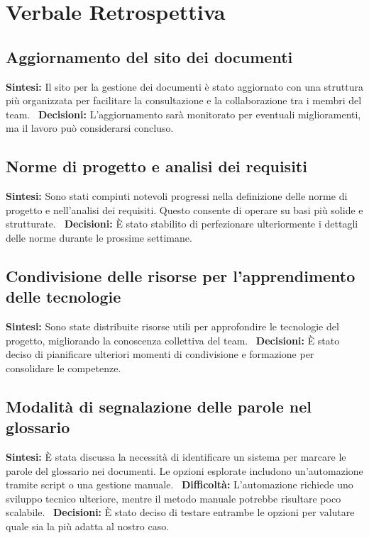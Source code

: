 \documentclass{article}
\begin{document}
\section{Verbale Retrospettiva}

\subsection{Aggiornamento del sito dei documenti} \textbf{Sintesi:} Il sito per la gestione dei documenti è stato aggiornato con una struttura più organizzata per facilitare la consultazione e la collaborazione tra i membri del team. \ \textbf{Decisioni:} L'aggiornamento sarà monitorato per eventuali miglioramenti, ma il lavoro può considerarsi concluso.

\subsection{Norme di progetto e analisi dei requisiti} \textbf{Sintesi:} Sono stati compiuti notevoli progressi nella definizione delle norme di progetto e nell’analisi dei requisiti. Questo consente di operare su basi più solide e strutturate. \ \textbf{Decisioni:} È stato stabilito di perfezionare ulteriormente i dettagli delle norme durante le prossime settimane.

\subsection{Condivisione delle risorse per l'apprendimento delle tecnologie} \textbf{Sintesi:} Sono state distribuite risorse utili per approfondire le tecnologie del progetto, migliorando la conoscenza collettiva del team. \ \textbf{Decisioni:} È stato deciso di pianificare ulteriori momenti di condivisione e formazione per consolidare le competenze.

\subsection{Modalità di segnalazione delle parole nel glossario} \textbf{Sintesi:} È stata discussa la necessità di identificare un sistema per marcare le parole del glossario nei documenti. Le opzioni esplorate includono un'automazione tramite script o una gestione manuale. \ \textbf{Difficoltà:} L'automazione richiede uno sviluppo tecnico ulteriore, mentre il metodo manuale potrebbe risultare poco scalabile. \ \textbf{Decisioni:} È stato deciso di testare entrambe le opzioni per valutare quale sia la più adatta al nostro caso.
\end{document}
